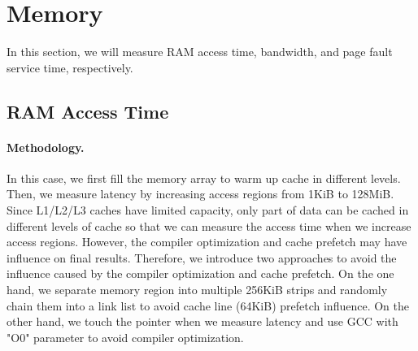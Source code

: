 \section{Memory}
\label{sec:intro}
In this section, we will measure RAM access time, bandwidth, and page fault service time, respectively.

\subsection{RAM  Access Time}
\paragraph{Methodology.}
In this case, we first fill the memory array to 
warm up cache in different levels. Then, we measure latency by increasing 
access regions from 1KiB to 128MiB. Since L1/L2/L3 caches have limited capacity, only part
of data can be cached in different levels of cache so that we can measure the access time when
we increase access regions. However, the compiler optimization and cache prefetch may have influence
on final results. Therefore, we introduce two approaches to avoid the influence caused by the
compiler optimization and cache prefetch. On the one hand, we separate memory region into multiple
256KiB strips and randomly chain them into a link list to avoid cache line (64KiB) prefetch influence.
On the other hand, we touch the pointer when we measure latency and use GCC with "O0" parameter to avoid
compiler optimization.

